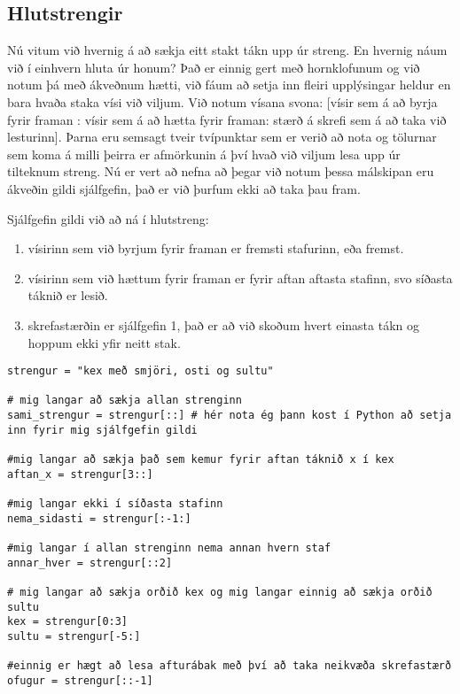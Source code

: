 \subsection{Hlutstrengir}
Nú vitum við hvernig á að sækja eitt stakt tákn upp úr streng.
En hvernig náum við í einhvern hluta úr honum?
Það er einnig gert með hornklofunum og við notum þá með ákveðnum hætti, við fáum að setja inn fleiri upplýsingar heldur en bara hvaða staka vísi við viljum.
Við notum vísana svona: [vísir sem á að byrja fyrir framan : vísir sem á að hætta fyrir framan: stærð á skrefi sem á að taka við lesturinn].
Þarna eru semsagt tveir tvípunktar sem er verið að nota og tölurnar sem koma á milli þeirra er afmörkunin á því hvað við viljum lesa upp úr tilteknum streng.
Nú er vert að nefna að þegar við notum þessa málskipan eru ákveðin gildi sjálfgefin, það er við þurfum ekki að taka þau fram.

Sjálfgefin gildi við að ná í hlutstreng:
\begin{enumerate}
	\item vísirinn sem við byrjum fyrir framan er fremsti stafurinn, eða fremst.
	\item vísirinn sem við hættum fyrir framan er fyrir aftan aftasta stafinn, svo síðasta táknið er lesið.
	\item skrefastærðin er sjálfgefin 1, það er að við skoðum hvert einasta tákn og hoppum ekki yfir neitt stak.
\end{enumerate}

\begin{lstlisting}[caption=Hlutstrengir, label=lst:hlutstrengir]
strengur = "kex með smjöri, osti og sultu"

# mig langar að sækja allan strenginn
sami_strengur = strengur[::] # hér nota ég þann kost í Python að setja inn fyrir mig sjálfgefin gildi

#mig langar að sækja það sem kemur fyrir aftan táknið x í kex
aftan_x = strengur[3::]

#mig langar ekki í síðasta stafinn
nema_sidasti = strengur[:-1:]

#mig langar í allan strenginn nema annan hvern staf
annar_hver = strengur[::2]

# mig langar að sækja orðið kex og mig langar einnig að sækja orðið sultu
kex = strengur[0:3]
sultu = strengur[-5:]

#einnig er hægt að lesa afturábak með því að taka neikvæða skrefastærð
ofugur = strengur[::-1]
\end{lstlisting}


